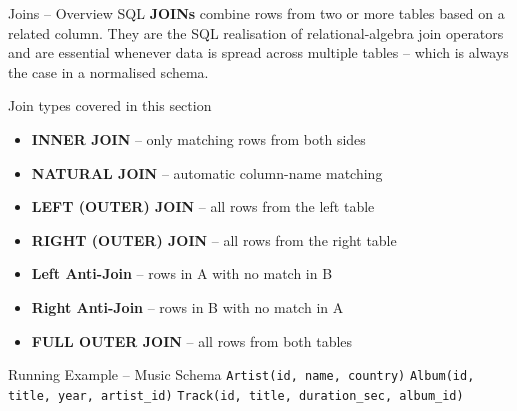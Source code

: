 
\begin{frame}{Joins -- Overview}
  SQL \textbf{JOINs} combine rows from two or more tables based on a related column.
  They are the SQL realisation of relational-algebra join operators and are essential
  whenever data is spread across multiple tables -- which is always the case in a
  normalised schema.

  \begin{block}{Join types covered in this section}
    \begin{itemize}
      \item \textbf{INNER JOIN} -- only matching rows from both sides
      \item \textbf{NATURAL JOIN} -- automatic column-name matching
      \item \textbf{LEFT (OUTER) JOIN} -- all rows from the left table
      \item \textbf{RIGHT (OUTER) JOIN} -- all rows from the right table
      \item \textbf{Left Anti-Join} -- rows in A with no match in B
      \item \textbf{Right Anti-Join} -- rows in B with no match in A
      \item \textbf{FULL OUTER JOIN} -- all rows from both tables
    \end{itemize}
  \end{block}

  \begin{exampleblock}{Running Example -- Music Schema}
    \texttt{Artist(id, name, country)} \quad
    \texttt{Album(id, title, year, artist\_id)} \quad
    \texttt{Track(id, title, duration\_sec, album\_id)}
  \end{exampleblock}
\end{frame}

